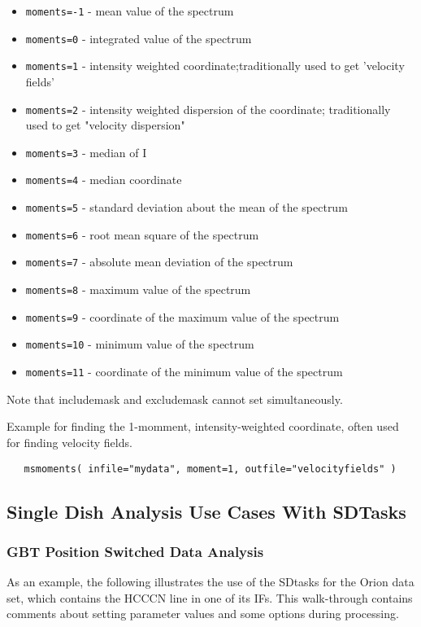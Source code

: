 \begin{itemize}
   \item {\tt moments=-1} - mean value of the spectrum
   \item {\tt moments=0}  - integrated value of the spectrum
   \item {\tt moments=1}  - intensity weighted coordinate;traditionally used to get 'velocity fields'
   \item {\tt moments=2}  - intensity weighted dispersion of the coordinate; traditionally used to get "velocity dispersion"
   \item {\tt moments=3}  - median of I
   \item {\tt moments=4}  - median coordinate
   \item {\tt moments=5}  - standard deviation about the mean of the spectrum
   \item {\tt moments=6}  - root mean square of the spectrum
   \item {\tt moments=7}  - absolute mean deviation of the spectrum
   \item {\tt moments=8}  - maximum value of the spectrum
   \item {\tt moments=9}  - coordinate of the maximum value of the spectrum
   \item {\tt moments=10} - minimum value of the spectrum
   \item {\tt moments=11} - coordinate of the minimum value of the spectrum
\end{itemize}

Note that includemask and excludemask cannot set simultaneously. 

Example for finding the 1-momment, intensity-weighted
coordinate, often used for finding velocity fields.

\begin{verbatim}
   msmoments( infile="mydata", moment=1, outfile="velocityfields" )
\end{verbatim}



\subsection{Single Dish Analysis Use Cases With SDTasks}
\label{section:sd.sdtasks.usecase}

\subsubsection{GBT Position Switched Data Analysis}
As an example, the following illustrates the use of the SDtasks for
the Orion data set, which contains the HCCCN line in one of its IFs.
This walk-through contains comments about setting parameter values
and some options during processing.

